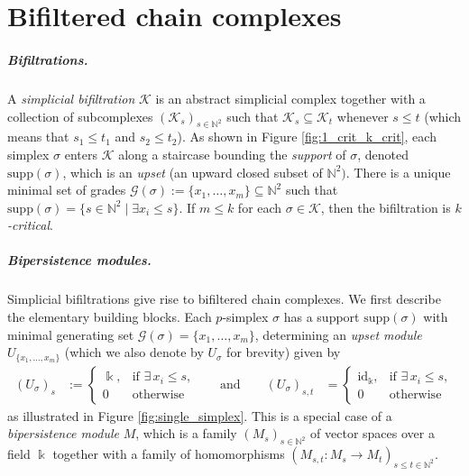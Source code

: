 \documentclass[11pt]{article}
\newcommand{\define}[1]{\emph{#1}} %
\newcommand{\field}{\Bbbk}
\begin{document}
\section{Bifiltered chain complexes}
\label{sec:Background}
%
\subparagraph{Bifiltrations.} A \define{simplicial bifiltration} $\mathcal{K}$ is an abstract simplicial complex together with a collection of subcomplexes $(\mathcal{K}_s)_{s\in \mathbb{N}^2}$ such that $\mathcal{K}_s\subseteq \mathcal{K}_t$ whenever $s\leq t$ (which means that $s_1\leq t_1$ and $s_2\leq t_2$).
As shown in Figure \ref{fig:1_crit_k_crit}, each simplex $\sigma$ enters $\mathcal{K}$ along a staircase bounding the \define{support} of $\sigma$, denoted $\mathrm{supp}(\sigma)$, which is an \define{upset} (an upward closed subset of $\mathbb{N}^2)$.
There is a unique minimal set of grades
$\mathcal{G}(\sigma):=\{x_1,\dots,x_m\}\subseteq \mathbb{N}^2$ 
such that $\mathrm{supp}(\sigma)=\{ s\in \mathbb{N}^2\mid \exists x_i\leq s\}$.
If $m\leq k$ for each $\sigma \in \mathcal{K}$, then the bifiltration is \define{$k$-critical}. 
%
%
\subparagraph{Bipersistence modules.}
%
Simplicial bifiltrations give rise to bifiltered chain complexes. 
We first describe the elementary building blocks.
Each $p$-simplex $\sigma$ has a support $\mathrm{supp}(\sigma)$ with minimal generating set $\mathcal{G}(\sigma)=\{x_1,\dots,x_m\}$,
determining an \define{upset module} $U_{\{x_1,\dots,x_m\}}$ (which we also denote by $U_\sigma$ for brevity) given by 
\begin{equation*}
\begin{aligned}
(U_\sigma)_s &:= 
\begin{cases}
\field, & \text{if } \exists\, x_i \leq s, \\[6pt]
0 & \text{otherwise}
\end{cases}
&
\quad \text{and}\qquad
(U_\sigma)_{s, t} &= 
\begin{cases}
\mathrm{id}_\field, & \text{if } \exists\, x_i \leq s, \\[6pt]
0 & \text{otherwise}
\end{cases}
\end{aligned}
\end{equation*}
as illustrated in Figure \ref{fig:single_simplex}.
%
This is a special case of a \define{bipersistence module} $M$, which is a family $(M_s)_{s\in\mathbb{N}^2}$ of vector spaces over a field $\field$ together with a family of homomorphisms $(M_{s,t}\colon M_s \rightarrow M_t)_{s\leq t\in \mathbb{N}^2}$.
\end{document}
